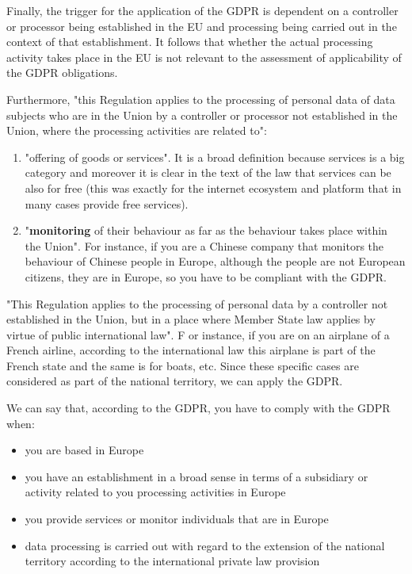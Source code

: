 Finally, the trigger for the application of the GDPR is dependent on a controller or processor being established in the EU and processing being carried out in the context of that establishment. It follows that whether the actual processing activity takes place in the EU is not relevant to the assessment of applicability of the GDPR obligations.


Furthermore, "this Regulation applies to the processing of personal data of data subjects who are in the Union by a controller or processor not established in the Union, where the processing activities are related to":
\begin{enumerate}
    \item "offering of goods or services". It is a broad definition because services is a big category and moreover it is clear in the text of the law that services can be also for free (this was exactly for the internet ecosystem and platform that in many cases provide free services).
    \item "\textbf{monitoring} of their behaviour as far as the behaviour takes place within the Union". For instance, if you are a Chinese company that monitors the behaviour of Chinese people in Europe, although the people are not European citizens, they are in Europe, so you have to be compliant with the GDPR.
\end{enumerate}
"This Regulation applies to the processing of personal data by a controller not established in the Union, but in a place where Member State law applies by virtue of public international law". F or instance, if you are on an airplane of a French airline, according to the international law this airplane is part of the French state and the same is for boats, etc. Since these specific cases are considered as part of the national territory, we can apply the GDPR.

We can say that, according to the GDPR, you have to comply with the GDPR when:
\begin{itemize}
    \item you are based in Europe
    \item you have an establishment in a broad sense in terms of a subsidiary or activity related to you processing activities in Europe
    \item you provide services or monitor individuals that are in Europe
    \item data processing is carried out with regard to the extension of the national territory according to the international private law provision
\end{itemize}
